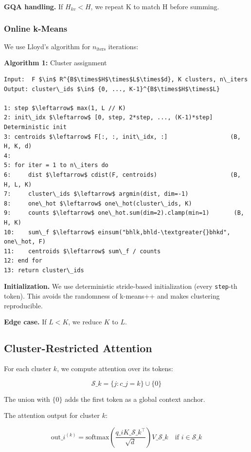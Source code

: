 \textbf{GQA handling.} If $H_{kv} < H$, we repeat K to match H before summing.

\subsubsection{Online k-Means}

We use Lloyd's algorithm for $n_{\text{iters}}$ iterations:

\textbf{Algorithm 1:} Cluster assignment
\begin{lstlisting}
Input:  F $\in$ R^{B$\times$H$\times$L$\times$d}, K clusters, n\_iters
Output: cluster\_ids $\in$ {0, ..., K-1}^{B$\times$H$\times$L}

1: step $\leftarrow$ max(1, L // K)
2: init\_idx $\leftarrow$ [0, step, 2*step, ..., (K-1)*step]    Deterministic init
3: centroids $\leftarrow$ F[:, :, init\_idx, :]                  (B, H, K, d)
4:
5: for iter = 1 to n\_iters do
6:     dist $\leftarrow$ cdist(F, centroids)                     (B, H, L, K)
7:     cluster\_ids $\leftarrow$ argmin(dist, dim=-1)
8:     one\_hot $\leftarrow$ one\_hot(cluster\_ids, K)
9:     counts $\leftarrow$ one\_hot.sum(dim=2).clamp(min=1)       (B, H, K)
10:    sum\_f $\leftarrow$ einsum("bhlk,bhld-\textgreater{}bhkd", one\_hot, F)
11:    centroids $\leftarrow$ sum\_f / counts
12: end for
13: return cluster\_ids
\end{lstlisting}

\textbf{Initialization.} We use deterministic stride-based initialization (every 
\texttt{step}-th token). This avoids the randomness of k-means++ and makes 
clustering reproducible.

\textbf{Edge case.} If $L < K$, we reduce $K$ to $L$.

\subsection{Cluster-Restricted Attention}

For each cluster $k$, we compute attention over its tokens:

\[
\mathcal{S}\_k = \{j : c\_j = k\} \cup \{0\}
\tag{4.2}
\]

The union with $\{0\}$ adds the first token as a global context anchor.

The attention output for cluster $k$:

\[
\text{out}\_i^{(k)} = \text{softmax}\!\left(\frac{q\_i K\_{\mathcal{S}\_k}^\top}{\sqrt{d}}\right) V\_{\mathcal{S}\_k} \quad \text{if } i \in \mathcal{S}\_k
\tag{4.3}
\]

